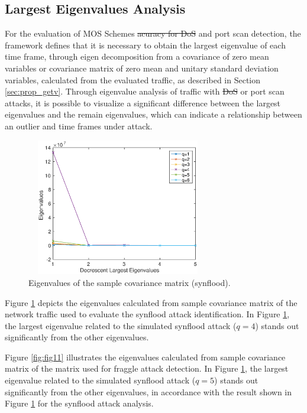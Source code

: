 \documentclass[review]{elsarticle}
\providecommand{\DIFaddtex}[1]{{\protect\color{blue}\uwave{#1}}} %
\providecommand{\DIFdeltex}[1]{{\protect\color{red}\sout{#1}}}                      %
\providecommand{\DIFaddbegin}{} %
\providecommand{\DIFaddend}{} %
\providecommand{\DIFdelbegin}{} %
\providecommand{\DIFdelend}{} %
\providecommand{\DIFadd}[1]{\texorpdfstring{\DIFaddtex{#1}}{#1}} %
\providecommand{\DIFdel}[1]{\texorpdfstring{\DIFdeltex{#1}}{}} %
\begin{document}
\subsection{Largest Eigenvalues Analysis}
\label{sec:largesteigenvaluesanalysis}

For the evaluation of MOS Schemes \DIFdelbegin \DIFdel{acuracy for DoS }\DIFdelend \DIFaddbegin \DIFadd{accuracy for flood }\DIFaddend and port scan detection, the framework defines that it is necessary to obtain the largest eigenvalue of each time frame, through eigen decomposition from a covariance of zero mean variables or covariance matrix of zero mean and unitary standard deviation variables, calculated from the evaluated traffic, as described in Section \ref{sec:prop_getv}. Through eigenvalue analysis of traffic with \DIFdelbegin \DIFdel{DoS }\DIFdelend \DIFaddbegin \DIFadd{flood }\DIFaddend or port scan attacks, it is possible to visualize a significant difference between the largest eigenvalues and the remain eigenvalues, which can indicate a relationship between an outlier and time frames under attack.

\begin{figure}[h!]
	\centering
     \includegraphics[height=6cm, width=8cm]{results/figures/eigenvalues_synflood.eps} 
     \caption{Eigenvalues of the sample covariance matrix (synflood).}
     \label{fig:fig10}
\end{figure}

Figure \ref{fig:fig10} depicts the eigenvalues calculated from sample covariance matrix of the network traffic used to evaluate the synflood attack identification. In Figure \ref{fig:fig10}, the largest eigenvalue related to the simulated synflood attack ($q = 4$) stands out significantly from the other eigenvalues.

Figure \ref{fig:fig11} illustrates the eigenvalues calculated from sample covariance matrix of the matrix used for fraggle attack detection. In Figure \ref{fig:fig10}, the largest eigenvalue related to the simulated synflood attack ($q = 5$) stands out significantly from the other eigenvalues, in accordance with the result shown in Figure \ref{fig:fig10} for the synflood attack analysis.
\end{document}
